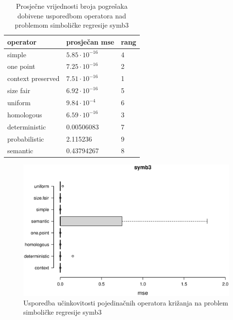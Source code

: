 \begin{table}[H]
 	\centering

    \begin{tabular}{| l | l | l |}
    \hline
    \textbf{operator} & \textbf{prosječan mse} & \textbf{rang}\\ \hline
    simple & $5.85 \cdot 10^{-16}$ & 4\\ \hline
    one point & $7.25 \cdot 10^{-16}$ & 2\\ \hline
    context preserved & $7.51 \cdot 10^{-16}$ & 1 \\ \hline
    size fair & $6.92 \cdot 10^{-16}$ & 5\\ \hline
    uniform & $9.84 \cdot 10^{-4}$ & 6\\ \hline
    homologous & $6.59 \cdot 10^{-16}$ & 3\\ \hline
    deterministic & 0.00506083 & 7\\ \hline
    probabilistic & 2.115236 & 9\\ \hline
    semantic & 0.43794267 & 8\\ \hline
    \end{tabular}
    
    \caption{Prosječne vrijednosti broja pogrešaka dobivene usporedbom operatora nad problemom simboličke regresije symb3}
    \label{symb3table}
\end{table}

\begin{figure}[H]
	\centering
	\includegraphics[trim=0cm 4cm 0cm 0cm, scale=0.6]{./slike/boxPlots/symb3.eps}
	\caption{Usporedba učinkovitosti pojedinačnih operatora križanja na problem simboličke regresije symb3}
	\label{symb3box}
\end{figure}

